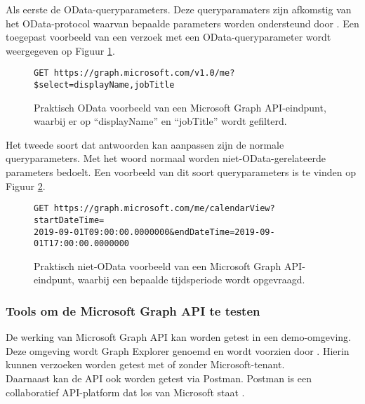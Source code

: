 Als eerste de OData-queryparameters. Deze queryparamaters zijn afkomstig van het OData-protocol waarvan bepaalde parameters worden ondersteund door \textcite{Microsoft2023g}. Een toegepast voorbeeld van een verzoek met een OData-queryparameter wordt weergegeven op Figuur \ref{TRAM}. \\

\begin{figure}[h]
    \footnotesize\begin{verbatim}GET https://graph.microsoft.com/v1.0/me?$select=displayName,jobTitle
    \end{verbatim}    
    \caption[Voorbeeld OData HTTP-verzoek]{Praktisch OData voorbeeld van een Microsoft Graph \Ac{API}-eindpunt, waarbij er op “displayName” en “jobTitle” wordt gefilterd.}
    \label{TRAM}
\end{figure}

Het tweede soort dat antwoorden kan aanpassen zijn de normale queryparameters. Met het woord normaal worden niet-OData-gerelateerde parameters bedoelt. Een voorbeeld van dit soort queryparameters is te vinden op Figuur \ref{NRAM}. \\

\begin{figure}[h]
    \footnotesize\begin{verbatim}GET https://graph.microsoft.com/me/calendarView?startDateTime=
2019-09-01T09:00:00.0000000&endDateTime=2019-09-01T17:00:00.0000000
    \end{verbatim}    
    \caption[Voorbeeld niet-OData HTTP-verzoek]{Praktisch niet-OData voorbeeld van een Microsoft Graph \Ac{API}-eindpunt, waarbij een bepaalde tijdsperiode wordt opgevraagd.}
    \label{NRAM}
\end{figure}

\subsubsection{Tools om de Microsoft Graph API te testen}

De werking van Microsoft Graph API kan worden getest in een demo-omgeving. Deze omgeving wordt Graph Explorer genoemd en wordt voorzien door \textcite{Microsoft2023h}. Hierin kunnen verzoeken worden getest met of zonder Microsoft-tenant. \\

Daarnaast kan de API ook worden getest via Postman. Postman is een collaboratief \ac{API}-platform dat los van Microsoft staat \autocite{Postman2023}.

